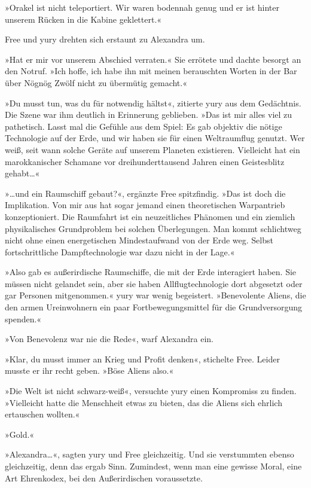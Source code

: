 »Orakel ist nicht teleportiert. Wir waren bodennah genug und er ist hinter unserem Rücken in die Kabine geklettert.«

Free und yury drehten sich erstaunt zu Alexandra um.

»Hat er mir vor unserem Abschied verraten.« Sie errötete und dachte besorgt an den Notruf. »Ich hoffe, ich habe ihn mit meinen berauschten Worten in der Bar über Nögnög Zwölf nicht zu übermütig gemacht.«

»Du musst tun, was du für notwendig hältst«, zitierte yury aus dem Gedächtnis. Die Szene war ihm deutlich in Erinnerung geblieben. »Das ist mir alles viel zu pathetisch. Lasst mal die Gefühle aus dem Spiel: Es gab objektiv die nötige Technologie auf der Erde, und wir haben sie für einen Weltraumflug genutzt. Wer weiß, seit wann solche Geräte auf unserem Planeten existieren. Vielleicht hat ein marokkanischer Schamane vor dreihunderttausend Jahren einen Geistesblitz gehabt…«

»…und ein Raumschiff gebaut?«, ergänzte Free spitzfindig. »Das ist doch die Implikation. Von mir aus hat sogar jemand einen theoretischen Warpantrieb konzeptioniert. Die Raumfahrt ist ein neuzeitliches Phänomen und ein ziemlich physikalisches Grundproblem bei solchen Überlegungen. Man kommt schlichtweg nicht ohne einen energetischen Mindestaufwand von der Erde weg. Selbst fortschrittliche Dampftechnologie war dazu nicht in der Lage.«

»Also gab es außerirdische Raumschiffe, die mit der Erde interagiert haben. Sie müssen nicht gelandet sein, aber sie haben Allflugtechnologie dort abgesetzt oder gar Personen mitgenommen.« yury war wenig begeistert. »Benevolente Aliens, die den armen Ureinwohnern ein paar Fortbewegungsmittel für die Grundversorgung spenden.«

»Von Benevolenz war nie die Rede«, warf Alexandra ein.

»Klar, du musst immer an Krieg und Profit denken«, stichelte Free. Leider musste er ihr recht geben. »Böse Aliens also.«

»Die Welt ist nicht schwarz-weiß«, versuchte yury einen Kompromiss zu finden. »Vielleicht hatte die Menschheit etwas zu bieten, das die Aliens sich ehrlich ertauschen wollten.«

»Gold.«

»Alexandra…«, sagten yury und Free gleichzeitig. Und sie verstummten ebenso gleichzeitig, denn das ergab Sinn. Zumindest, wenn man eine gewisse Moral, eine Art Ehrenkodex, bei den Außerirdischen voraussetzte.

